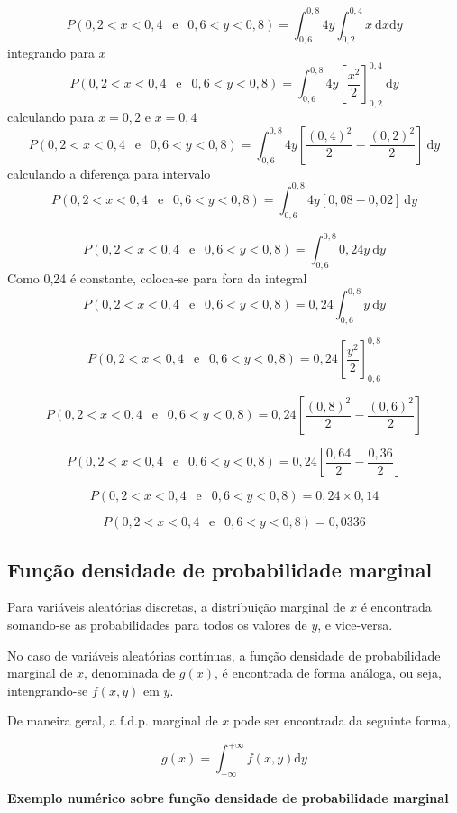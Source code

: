 \documentclass[
]{book}
\begin{document}
\[
  P(0,2 < x < 0,4~~\text{ e }~~0,6 < y < 0,8) = \int_{0,6}^{0,8}4y\int_{0,2}^{0,4}x~\text{d}x \text{d}y
\]
integrando para \(x\)
\[
  P(0,2 < x < 0,4~~\text{ e }~~0,6 < y < 0,8) = \int_{0,6}^{0,8}4y\left[\dfrac{x^2}{2} \right]_{0,2}^{0,4}~\text{d}y
\]
calculando para \(x=0,2\) e \(x=0,4\)
\[
  P(0,2 < x < 0,4~~\text{ e }~~0,6 < y < 0,8) = \int_{0,6}^{0,8}4y\left[\dfrac{(0,4)^2}{2} - \dfrac{(0,2)^2}{2} \right]~\text{d}y
\]
calculando a diferença para intervalo
\[
  P(0,2 < x < 0,4~~\text{ e }~~0,6 < y < 0,8) = \int_{0,6}^{0,8}4y\left[0,08 - 0,02 \right]~\text{d}y
\]

\[
  P(0,2 < x < 0,4~~\text{ e }~~0,6 < y < 0,8) = \int_{0,6}^{0,8}0,24y~\text{d}y
\]
Como 0,24 é constante, coloca-se para fora da integral
\[
  P(0,2 < x < 0,4~~\text{ e }~~0,6 < y < 0,8) = 0,24\int_{0,6}^{0,8}y~\text{d}y
\]

\[
  P(0,2 < x < 0,4~~\text{ e }~~0,6 < y < 0,8) = 0,24\left[  \dfrac{y^2}{2}\right]_{0,6}^{0,8}
\]

\[
  P(0,2 < x < 0,4~~\text{ e }~~0,6 < y < 0,8) = 0,24\left[  \dfrac{(0,8)^2}{2} - \dfrac{(0,6)^2}{2}\right]
\]

\[
  P(0,2 < x < 0,4~~\text{ e }~~0,6 < y < 0,8) = 0,24\left[  \dfrac{0,64}{2} - \dfrac{0,36}{2}\right]
\]

\[
  P(0,2 < x < 0,4~~\text{ e }~~0,6 < y < 0,8) = 0,24\times 0,14
\]

\[
  P(0,2 < x < 0,4~~\text{ e }~~0,6 < y < 0,8) = 0,0336
\]

\hypertarget{funuxe7uxe3o-densidade-de-probabilidade-marginal}{%
\subsection{Função densidade de probabilidade marginal}\label{funuxe7uxe3o-densidade-de-probabilidade-marginal}}

Para variáveis aleatórias discretas, a distribuição marginal de \(x\) é encontrada somando-se as probabilidades para todos os valores de \(y\), e vice-versa.

No caso de variáveis aleatórias contínuas, a função densidade de probabilidade marginal de \(x\), denominada de \(g(x)\), é encontrada de forma análoga, ou seja, intengrando-se \(f(x,y)\) em \(y\).

De maneira geral, a f.d.p. marginal de \(x\) pode ser encontrada da seguinte forma,

\[
  g(x) = \int_{-\infty}^{+\infty} f(x,y) \text{d}y
\]

\textbf{Exemplo numérico sobre função densidade de probabilidade marginal}
\end{document}
